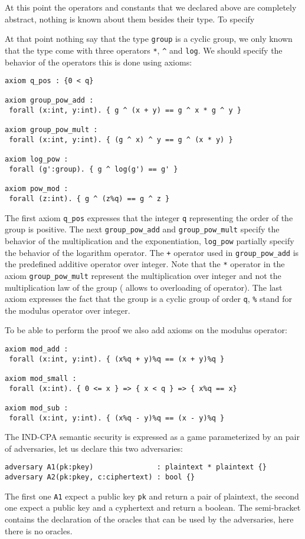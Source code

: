 At this point the operators and constants that we declared above are
completely abstract, nothing is known about them besides their
type. To specify

At that point nothing say that the type \verb+group+ is a cyclic
group, we only known that the type come with three
operators \verb+*+, \verb+^+ and \verb+log+. We should specify the
behavior of the operators this is done using axioms:

\begin{verbatim}
axiom q_pos : {0 < q}

axiom group_pow_add : 
 forall (x:int, y:int). { g ^ (x + y) == g ^ x * g ^ y }

axiom group_pow_mult :
 forall (x:int, y:int). { (g ^ x) ^ y == g ^ (x * y) } 

axiom log_pow : 
 forall (g':group). { g ^ log(g') == g' }

axiom pow_mod : 
 forall (z:int). { g ^ (z%q) == g ^ z }
\end{verbatim}
      The first axiom \verb+q_pos+ expresses that the integer \verb+q+ 
      representing the order of the group is positive. 
      The next \verb+group_pow_add+ and \verb+group_pow_mult+ specify the 
      behavior of the multiplication and the exponentiation,  
      \verb+log_pow+ partially specify the behavior of the logarithm operator.
      The \verb|+| operator used in \verb+group_pow_add+ is the predefined 
      additive operator over integer. Note that the \verb+*+ operator in 
      the axiom \verb+group_pow_mult+ represent the multiplication over 
      integer and not the multiplication law of the group 
      (\easycrypt{} allows to overloading of operator). 
      The last axiom expresses the fact that the group is a cyclic group of 
      order \verb+q+, \verb+%+ stand for the modulus operator over integer.

      To be able to perform the proof we also add axioms on the modulus operator:
\begin{verbatim}
axiom mod_add : 
 forall (x:int, y:int). { (x%q + y)%q == (x + y)%q }

axiom mod_small : 
 forall (x:int). { 0 <= x } => { x < q } => { x%q == x}

axiom mod_sub : 
 forall (x:int, y:int). { (x%q - y)%q == (x - y)%q } 
\end{verbatim}

The IND-CPA semantic security is expressed as a game parameterized by an pair 
of adversaries, let us declare this two adversaries:
\begin{verbatim}
adversary A1(pk:pkey)               : plaintext * plaintext {}
adversary A2(pk:pkey, c:ciphertext) : bool {}
\end{verbatim}
The first one \verb+A1+ expect a public key \verb+pk+ and return a pair 
of plaintext, the second one expect a public key and a cyphertext and return
a boolean. The semi-bracket contains the declaration of the oracles that can
be used by the adversaries, here there is no oracles.

